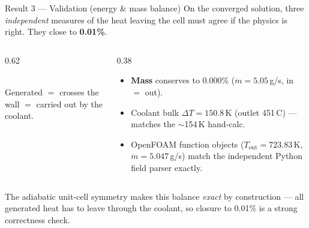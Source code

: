 \documentclass[aspectratio=169,11pt]{beamer}
\newcommand{\kw}[1]{{\color{RadBlue}\bfseries #1}}
\newcommand{\amberkw}[1]{{\color{RadHot}\bfseries #1}}
\begin{document}
\begin{frame}{Result 3 --- Validation (energy \& mass balance)}
\vspace{-0.05cm}
{\small On the converged solution, three \emph{independent} measures of the heat leaving the cell must agree if the physics is right. They close to \amberkw{0.01\%}.}
\vspace{0.25cm}

\begin{columns}[c]
\begin{column}{0.62\textwidth}
\centering
{}\\[4pt]
{\color{RadGray}\scriptsize Generated $=$ crosses the wall $=$ carried out by the coolant.}
\end{column}
\begin{column}{0.38\textwidth}
\begin{itemize}\small
  \item \kw{Mass} conserves to 0.000\% ($\dot m = 5.05$\,g/s, in $=$ out).
  \item Coolant bulk $\Delta T = 150.8$\,K (outlet 451\,\textdegree C) --- matches the $\sim$154\,K hand-calc.
  \item OpenFOAM function objects ($T_\text{out}=723.83$\,K, $\dot m=5.047$\,g/s) match the independent Python field parser exactly.
\end{itemize}
\end{column}
\end{columns}
\vspace{0.15cm}
{\color{RadGray}\footnotesize The adiabatic unit-cell symmetry makes this balance \emph{exact} by construction --- all generated heat has to leave through the coolant, so closure to 0.01\% is a strong correctness check.}
\end{frame}
\end{document}

